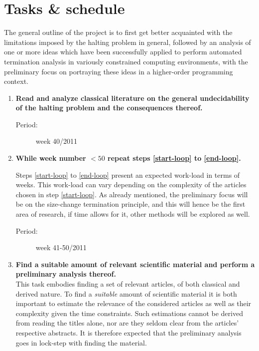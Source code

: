 \section{Tasks \& schedule}

The general outline of the project is to first get better acquainted with the 
limitations imposed by the halting problem in general, followed by an analysis 
of one or more ideas which have been successfully applied to perform automated 
termination analysis in variously constrained computing environments, with the 
preliminary focus on portraying these ideas in a higher-order programming 
context.

\begin{enumerate}

\item {\bf Read and analyze classical literature on the general undecidability 
of the halting problem and the consequences thereof.}

\begin{description}

\item [Period:] week 40/2011

\end{description}

\item {\bf While week number $<50$ repeat steps \ref{start-loop} to 
\ref{end-loop}.}

Steps \ref{start-loop} to \ref{end-loop} present an expected work-load in terms 
of weeks. This work-load can vary depending on the complexity of the articles 
chosen in step \ref{start-loop}. As already mentioned, the preliminary focus 
will be on the size-change termination principle, and this will hence be the 
first area of research, if time allows for it, other methods will be explored 
as well.

\begin{description}

\item [Period:] week 41-50/2011

\end{description}

\item {\bf Find a suitable amount of relevant scientific material and perform a 
preliminary analysis thereof.}\label{start-loop}\\

This task embodies finding a set of relevant articles, of both classical and 
derived nature.  To find a \emph{suitable} amount of scientific material it is 
both important to estimate the relevance of the considered articles as well as 
their complexity given the time constraints.  Such estimations cannot be 
derived from reading the titles alone, nor are they seldom clear from the 
articles' respective abstracts.  It is therefore expected that the preliminary 
analysis goes in lock-step with finding the material.


\end{enumerate}
